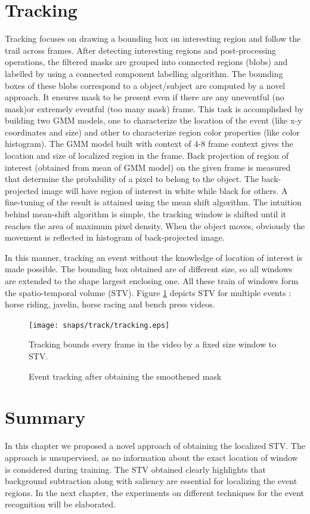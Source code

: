 \section{Tracking}
 \label{sec:trac}
Tracking focuses on drawing a bounding box  on interesting region and follow the trail across frames. After detecting interesting  regions and  post-processing operations, the filtered masks are grouped into connected regions (blobs) and labelled by using a connected component labelling algorithm. The bounding boxes of these blobs correspond to a object/subject are computed by a novel approach. It ensures mask to be present even if there are any uneventful (no mask)or extremely eventful (too many mask) frame.  This task is accomplished by building two GMM models, one to characterize the location of the event (like x-y coordinates and size) and other to characterize region color properties (like color histogram). The GMM model built with context of 4-8 frame context gives the location and size of localized region in the frame. 
Back projection \citep{backProj} of region of interest (obtained from mean of GMM model) on the given frame is measured that determine the probability of a pixel to belong to the object. The back-projected image  will have region of interest in white while black for others. A fine-tuning of the result is attained using the mean shift algorithm.  The intuition behind mean-shift algorithm is simple, the tracking window is shifted until it reaches the area of maximum pixel density. When the object moves, obviously the movement is reflected in histogram of back-projected image. 
\par In this manner, tracking an event  without the knowledge of location of interest is made possible. The bounding box obtained are of different size, so all windows are extended to the shape largest enclosing one. All these train of  windows form the spatio-temporal volume (STV). Figure \ref{fig:tracking} depicts STV for multiple events : horse riding, javelin, horse racing and bench press videos.
\begin{figure}[htpb]
   \begin{center}
	    \texttt{[image: snaps/track/tracking.eps]}     
     \caption {Event tracking after obtaining the smoothened mask}
     \medskip \small 
     Tracking bounds every frame in the video by a fixed size window to STV.
   \label{fig:tracking}
   \end{center}
 \end{figure}
\section{Summary}
In this chapter we proposed a novel approach of obtaining the localized STV. The approach is unsupervised, as no information about the exact location of window is considered during training. The STV obtained clearly highlights that background subtraction along with saliency are essential for localizing the event regions. In the next chapter, the experiments on different techniques for the event recognition will be elaborated.